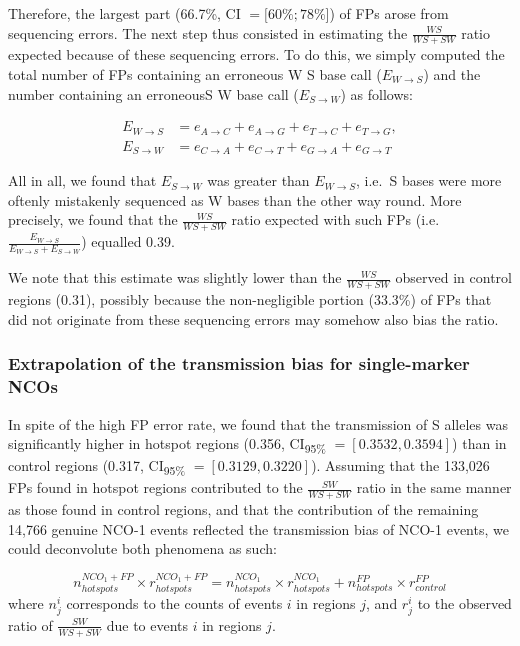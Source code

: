 Therefore, the largest part (66.7\%, CI $= [60\%; 78\%$]) of FPs arose from sequencing errors.
The next step thus consisted in estimating the $\frac{WS}{WS+SW}$ ratio expected because of these sequencing errors.
To do this, we simply computed the total number of FPs containing an erroneous W\textrightarrow{} S base call ($E_{W\rightarrow S}$) and the number containing an erroneousS\textrightarrow{} W base call ($E_{S\rightarrow W}$) as follows:

\begin{align}
        E_{W\rightarrow S}&= e_{A\rightarrow C} + e_{A\rightarrow G} + e_{T\rightarrow C} + e_{T\rightarrow G}, \\
        E_{S\rightarrow W}&= e_{C\rightarrow A} + e_{C\rightarrow T} + e_{G\rightarrow A} + e_{G\rightarrow T}
\end{align}

All in all, we found that $E_{S\rightarrow W}$ was greater than $E_{W\rightarrow S}$, i.e.\ S bases were more oftenly mistakenly sequenced as W bases than the other way round.
More precisely, we found that the $\frac{WS}{WS+SW}$ ratio expected with such FPs (i.e.\ $\frac{E_{W\rightarrow S}}{E_{W\rightarrow S} + E_{S\rightarrow W}}$) equalled 0.39.

We note that this estimate was slightly lower than the $\frac{WS}{WS+SW}$ observed in control regions (0.31), possibly because the non-negligible portion (33.3\%) of FPs that did not originate from these sequencing errors may somehow also bias the ratio.




\subsubsection{Extrapolation of the transmission bias for single-marker NCOs}

In spite of the high FP error rate, we found that the transmission of S alleles was significantly higher in hotspot regions (0.356, CI\textsubscript{95\%} $=[0.3532, 0.3594]$) than in control regions (0.317, CI\textsubscript{95\%} $=[0.3129,0.3220]$). 
Assuming that the 133,026 FPs found in hotspot regions contributed to the $\frac{SW}{WS+SW}$ ratio in the same manner as those found in control regions, and that the contribution of the remaining 14,766 genuine NCO-1 events reflected the transmission bias of NCO-1 events, we could deconvolute both phenomena as such:

\begin{equation*}
	n_{hotspots}^{NCO_1 + FP} \times r_{hotspots}^{NCO_1 + FP}  = n_{hotspots}^{NCO_1} \times r_{hotspots}^{NCO_1} + n_{hotspots}^{FP} \times r_{control}^{FP}
\end{equation*}
where $n_{j}^{i}$ corresponds to the counts of events $i$ in regions $j$, and $r_{j}^{i}$ to the observed ratio of $\frac{SW}{WS+SW}$ due to events $i$ in regions $j$.



